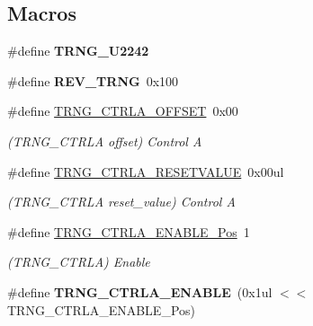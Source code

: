 \subsection*{Macros}
\begin{DoxyCompactItemize}
\item 
\hypertarget{group___s_a_m_l21___t_r_n_g_ga27faee130bdeb89bdd8c32f8db69d8b6}{}\#define {\bfseries T\+R\+N\+G\+\_\+\+U2242}\label{group___s_a_m_l21___t_r_n_g_ga27faee130bdeb89bdd8c32f8db69d8b6}

\item 
\hypertarget{group___s_a_m_l21___t_r_n_g_gaa5133b23da9ede2a80d744da07fe2b89}{}\#define {\bfseries R\+E\+V\+\_\+\+T\+R\+N\+G}~0x100\label{group___s_a_m_l21___t_r_n_g_gaa5133b23da9ede2a80d744da07fe2b89}

\item 
\hypertarget{group___s_a_m_l21___t_r_n_g_ga7e9c5fb1c03509a0724580a548412a60}{}\#define \hyperlink{group___s_a_m_l21___t_r_n_g_ga7e9c5fb1c03509a0724580a548412a60}{T\+R\+N\+G\+\_\+\+C\+T\+R\+L\+A\+\_\+\+O\+F\+F\+S\+E\+T}~0x00\label{group___s_a_m_l21___t_r_n_g_ga7e9c5fb1c03509a0724580a548412a60}

\begin{DoxyCompactList}\small\item\em (T\+R\+N\+G\+\_\+\+C\+T\+R\+L\+A offset) Control A \end{DoxyCompactList}\item 
\hypertarget{group___s_a_m_l21___t_r_n_g_gae652c07ea33be9d049a2962ed77b1db5}{}\#define \hyperlink{group___s_a_m_l21___t_r_n_g_gae652c07ea33be9d049a2962ed77b1db5}{T\+R\+N\+G\+\_\+\+C\+T\+R\+L\+A\+\_\+\+R\+E\+S\+E\+T\+V\+A\+L\+U\+E}~0x00ul\label{group___s_a_m_l21___t_r_n_g_gae652c07ea33be9d049a2962ed77b1db5}

\begin{DoxyCompactList}\small\item\em (T\+R\+N\+G\+\_\+\+C\+T\+R\+L\+A reset\+\_\+value) Control A \end{DoxyCompactList}\item 
\hypertarget{group___s_a_m_l21___t_r_n_g_ga0b64984dc62598c0b9ce9fdebb2154f1}{}\#define \hyperlink{group___s_a_m_l21___t_r_n_g_ga0b64984dc62598c0b9ce9fdebb2154f1}{T\+R\+N\+G\+\_\+\+C\+T\+R\+L\+A\+\_\+\+E\+N\+A\+B\+L\+E\+\_\+\+Pos}~1\label{group___s_a_m_l21___t_r_n_g_ga0b64984dc62598c0b9ce9fdebb2154f1}

\begin{DoxyCompactList}\small\item\em (T\+R\+N\+G\+\_\+\+C\+T\+R\+L\+A) Enable \end{DoxyCompactList}\item 
\hypertarget{group___s_a_m_l21___t_r_n_g_ga0c8fb2012087c473daad3ce736c132c6}{}\#define {\bfseries T\+R\+N\+G\+\_\+\+C\+T\+R\+L\+A\+\_\+\+E\+N\+A\+B\+L\+E}~(0x1ul $<$$<$ T\+R\+N\+G\+\_\+\+C\+T\+R\+L\+A\+\_\+\+E\+N\+A\+B\+L\+E\+\_\+\+Pos)\label{group___s_a_m_l21___t_r_n_g_ga0c8fb2012087c473daad3ce736c132c6}


\end{DoxyCompactItemize}
